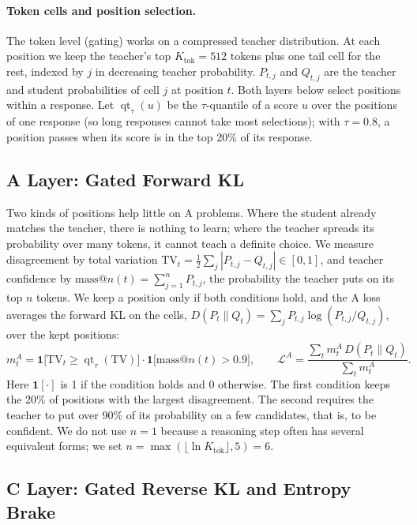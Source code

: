 \documentclass[10pt]{article}
\newcommand{\qt}{\operatorname{qt}}
\begin{document}
\paragraph{Token cells and position selection.} The token level (gating) works
on a compressed teacher distribution. At each position we keep the
teacher's top $K_{\mathrm{tok}}=512$ tokens plus one tail cell for the rest,
indexed by $j$ in decreasing teacher probability. $P_{t,j}$ and $Q_{t,j}$ are the teacher and student probabilities
of cell $j$ at position $t$. Both layers below select positions within a
response. Let $\qt_\tau(u)$ be the $\tau$-quantile of a score $u$ over the
positions of one response (so long responses cannot take most selections); with
$\tau=0.8$, a position passes when its score is in the top 20\% of its response.

\subsection{A Layer: Gated Forward KL}
\label{sec:layer-a}

Two kinds of positions help little on A problems. Where the student already
matches the teacher, there is nothing to learn; where the teacher spreads its
probability over many tokens, it cannot teach a definite choice. We
measure disagreement by total variation
$\mathrm{TV}_t=\frac12\sum_j|P_{t,j}-Q_{t,j}|\in[0,1]$, and teacher confidence
by $\mathrm{mass@}n(t)=\sum_{j=1}^{n}P_{t,j}$, the probability the teacher puts
on its top $n$ tokens. We keep a position only if both conditions hold, and the
A loss averages the forward KL on the cells,
$D(P_t\|Q_t)=\sum_j P_{t,j}\log(P_{t,j}/Q_{t,j})$, over the kept positions:
\begin{equation}
m^A_t=\mathbf 1\bigl[\mathrm{TV}_t\ge\qt_\tau(\mathrm{TV})\bigr]\cdot\mathbf 1\bigl[\mathrm{mass@}n(t)>0.9\bigr],
\qquad
\mathcal L^A=\frac{\sum_t m^A_t\,D(P_t\|Q_t)}{\sum_t m^A_t}.
\label{eq:gate-a}
\end{equation}
Here $\mathbf 1[\cdot]$ is 1 if the condition holds and 0 otherwise. The first
condition keeps the 20\% of positions with the largest disagreement. The second
requires the teacher to put over 90\% of its probability on a few candidates,
that is, to be confident. We do not use $n=1$ because a reasoning step often
has several equivalent forms; we set $n=\max(\lfloor\ln K_{\mathrm{tok}}\rfloor,5)=6$.

\subsection{C Layer: Gated Reverse KL and Entropy Brake}
\label{sec:layer-c}
\end{document}
